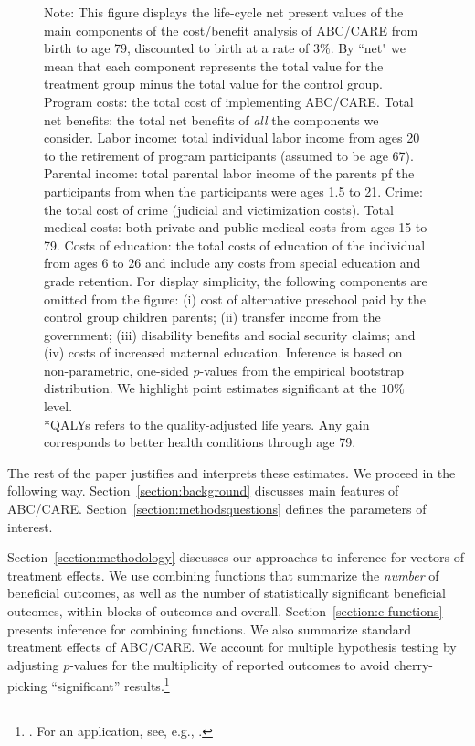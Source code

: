 \begin{figure}
{Note: This figure displays the life-cycle net present values of the main components of the cost/benefit analysis of ABC/CARE from birth to age 79, discounted to birth at a rate of 3\%.  By ``net" we mean that each component represents the total value for the treatment group minus the total value for the control group. Program costs: the total cost of implementing ABC/CARE. Total net benefits: the total net benefits of \textit{all} the components we consider. Labor income: total individual labor income from ages 20 to the retirement of program participants (assumed to be age 67). Parental income: total parental labor income of the parents pf the participants from when the participants were ages 1.5 to 21. Crime: the total cost of crime (judicial and victimization costs). Total medical costs: both private and public medical costs from ages 15 to 79. Costs of education: the total costs of education of the individual from ages 6 to 26 and include any costs from special education and grade retention. For display simplicity, the following components are omitted from the figure: (i) cost of alternative preschool paid by the control group children parents; (ii) transfer income from the government; (iii) disability benefits and social security claims; and (iv) costs of increased maternal education. Inference is based on non-parametric, one-sided $p$-values from the empirical bootstrap distribution. We highlight point estimates significant at the $10\%$ level.\\
*QALYs refers to the quality-adjusted life years. Any gain corresponds to better health conditions through age 79.}
\end{figure}

The rest of the paper justifies and interprets these estimates. We proceed in the following way. Section~\ref{section:background} discusses main features of ABC/CARE. Section~\ref{section:methodsquestions} defines the parameters of interest.

Section~\ref{section:methodology} discusses our approaches to inference for vectors of treatment effects. We use  combining functions that summarize the \emph{number} of beneficial outcomes, as well as the number of statistically significant beneficial outcomes, within blocks of outcomes and overall. Section~\ref{section:c-functions} presents inference for combining functions. We also summarize standard treatment effects of ABC/CARE. We account for multiple hypothesis testing by adjusting $p$-values for the multiplicity of reported outcomes to avoid cherry-picking ``significant'' results.\footnote{\citet{Lehman_Romano_2005_AnnStat,Romano_Shaikh_2006_AnnStat}. For an application, see, e.g., \cite{Heckman_Moon_etal_2010_QE}.}

